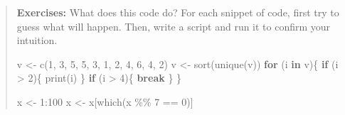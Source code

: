 \documentclass[
  letterpaper,
  DIV=11,
  numbers=noendperiod]{scrreprt}
\newenvironment{Shaded}{\begin{snugshade}}{\end{snugshade}}
\newcommand{\ControlFlowTok}[1]{\textcolor[rgb]{0.00,0.23,0.31}{\textbf{#1}}}
\newcommand{\DecValTok}[1]{\textcolor[rgb]{0.68,0.00,0.00}{#1}}
\newcommand{\FunctionTok}[1]{\textcolor[rgb]{0.28,0.35,0.67}{#1}}
\newcommand{\NormalTok}[1]{\textcolor[rgb]{0.00,0.23,0.31}{#1}}
\newcommand{\OtherTok}[1]{\textcolor[rgb]{0.00,0.23,0.31}{#1}}
\newcommand{\SpecialCharTok}[1]{\textcolor[rgb]{0.37,0.37,0.37}{#1}}
\begin{document}
\begin{quote}
\textbf{Exercises:} What does this code do? For each snippet of code,
first try to guess what will happen. Then, write a script and run it to
confirm your intuition.

\begin{Shaded}
\begin{Highlighting}[]
\NormalTok{v }\OtherTok{\textless{}{-}} \FunctionTok{c}\NormalTok{(}\DecValTok{1}\NormalTok{, }\DecValTok{3}\NormalTok{, }\DecValTok{5}\NormalTok{, }\DecValTok{5}\NormalTok{, }\DecValTok{3}\NormalTok{, }\DecValTok{1}\NormalTok{, }\DecValTok{2}\NormalTok{, }\DecValTok{4}\NormalTok{, }\DecValTok{6}\NormalTok{, }\DecValTok{4}\NormalTok{, }\DecValTok{2}\NormalTok{)}
\NormalTok{v }\OtherTok{\textless{}{-}} \FunctionTok{sort}\NormalTok{(}\FunctionTok{unique}\NormalTok{(v))}
\ControlFlowTok{for}\NormalTok{ (i }\ControlFlowTok{in}\NormalTok{ v)\{}
  \ControlFlowTok{if}\NormalTok{ (i }\SpecialCharTok{\textgreater{}} \DecValTok{2}\NormalTok{)\{}
    \FunctionTok{print}\NormalTok{(i)}
\NormalTok{  \}}
  \ControlFlowTok{if}\NormalTok{ (i }\SpecialCharTok{\textgreater{}} \DecValTok{4}\NormalTok{)\{}
    \ControlFlowTok{break}
\NormalTok{  \}}
\NormalTok{\}}
\end{Highlighting}
\end{Shaded}

\begin{Shaded}
\begin{Highlighting}[]
\NormalTok{x }\OtherTok{\textless{}{-}} \DecValTok{1}\SpecialCharTok{:}\DecValTok{100}
\NormalTok{x }\OtherTok{\textless{}{-}}\NormalTok{ x[}\FunctionTok{which}\NormalTok{(x }\SpecialCharTok{\%\%} \DecValTok{7} \SpecialCharTok{==} \DecValTok{0}\NormalTok{)]}
\end{Highlighting}
\end{Shaded}


\end{quote}
\end{document}
